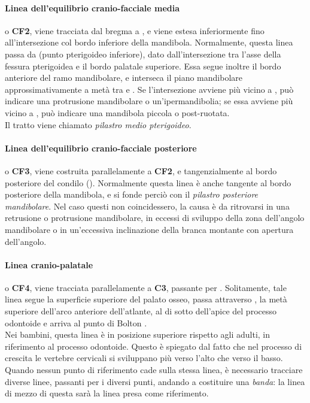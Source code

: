 \paragraph{Linea dell'equilibrio cranio-facciale media} o \textbf{CF2}, viene tracciata dal bregma  a , e viene estesa inferiormente fino all'intersezione col bordo inferiore della mandibola. Normalmente, questa linea passa da  (punto pterigoideo inferiore), dato dall'intersezione tra l'asse della fessura pterigoidea e il bordo palatale superiore. Essa segue inoltre il bordo anteriore del ramo mandibolare, e interseca il piano mandibolare approssimativamente a metà tra  e . Se l'intersezione avviene più vicino a , può indicare una protrusione mandibolare o un'ipermandibolia; se essa avviene più vicino a , può indicare una mandibola piccola o post-ruotata. \\ Il tratto  viene chiamato \emph{pilastro medio pterigoideo}.

\paragraph{Linea dell'equilibrio cranio-facciale posteriore} o \textbf{CF3}, viene costruita parallelamente a \textbf{CF2}, e tangenzialmente al bordo posteriore del condilo (). Normalmente questa linea è anche tangente al bordo posteriore della mandibola, e si fonde perciò con il \emph{pilastro posteriore mandibolare}. Nel caso questi non coincidessero, la causa è da ritrovarsi in una retrusione o protrusione mandibolare, in eccessi di sviluppo della zona dell'angolo mandibolare o in un'eccessiva inclinazione della branca montante con apertura dell'angolo.

\paragraph{Linea cranio-palatale} o \textbf{CF4}, viene tracciata parallelamente a \textbf{C3}, passante per . Solitamente, tale linea segue la superficie superiore del palato osseo, passa attraverso , la metà superiore dell'arco anteriore dell'atlante, al di sotto dell'apice del processo odontoide e arriva al punto di Bolton .\\
Nei bambini, questa linea è in posizione superiore rispetto agli adulti, in riferimento al processo odontoide. Questo è spiegato dal fatto che nel processo di crescita le vertebre cervicali si sviluppano più verso l'alto che verso il basso.\\
Quando nessun punto di riferimento cade sulla stessa linea, è necessario tracciare diverse linee, passanti per i diversi punti, andando a costituire una \emph{banda}: la linea di mezzo di questa sarà la linea presa come riferimento.

